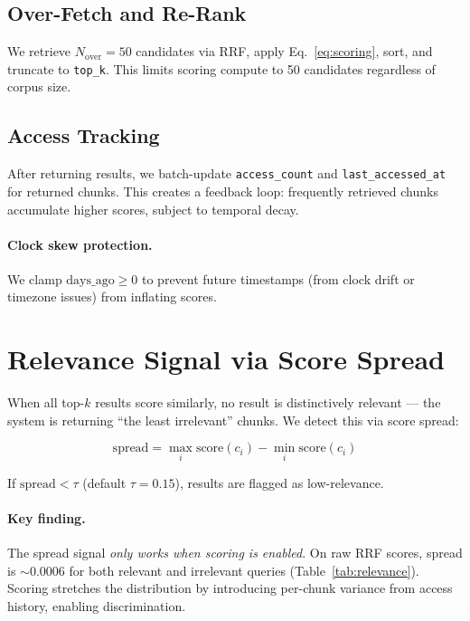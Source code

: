 \documentclass[11pt,a4paper]{article}
\begin{document}
\subsection{Over-Fetch and Re-Rank}

We retrieve $N_{\text{over}} = 50$ candidates via RRF, apply
Eq.~\ref{eq:scoring}, sort, and truncate to \texttt{top\_k}.  This
limits scoring compute to 50 candidates regardless of corpus size.

\subsection{Access Tracking}

After returning results, we batch-update \texttt{access\_count} and
\texttt{last\_accessed\_at} for returned chunks.  This creates a
feedback loop: frequently retrieved chunks accumulate higher scores,
subject to temporal decay.

\paragraph{Clock skew protection.}  We clamp
$\text{days\_ago} \geq 0$ to prevent future timestamps (from clock
drift or timezone issues) from inflating scores.


\section{Relevance Signal via Score Spread}
\label{sec:relevance}

When all top-$k$ results score similarly, no result is distinctively
relevant --- the system is returning ``the least irrelevant'' chunks.
We detect this via score spread:

\begin{equation}
  \text{spread} = \max_i \text{score}(c_i) - \min_i \text{score}(c_i)
  \label{eq:spread}
\end{equation}

\noindent If $\text{spread} < \tau$ (default $\tau = 0.15$), results
are flagged as low-relevance.

\paragraph{Key finding.}  The spread signal \emph{only works when
scoring is enabled}.  On raw RRF scores, spread is $\sim$0.0006 for
both relevant and irrelevant queries (Table~\ref{tab:relevance}).
Scoring stretches the distribution by introducing per-chunk variance
from access history, enabling discrimination.
\end{document}

